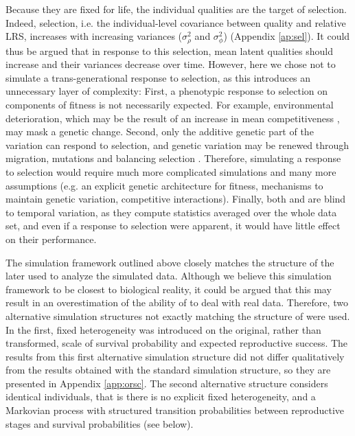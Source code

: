 Because they are fixed for life, the individual qualities are the target of selection. Indeed, selection, i.e. the individual-level covariance between quality and relative LRS, increases with increasing variances ($\sigma_{\rho}^2$ and $\sigma_{\phi}^2$) (Appendix \ref{ap:sel}). It could thus be argued that in response to this selection, mean latent qualities should increase and their variances decrease over time. However, here we chose not to simulate a trans-generational response to selection, as this introduces an unnecessary layer of complexity: First, a phenotypic response to selection on components of fitness is not necessarily expected. For example, environmental deterioration, which may be the result of an increase in mean competitiveness \parencite{Fisher1958,Hadfield2011}, may mask a genetic change. Second, only the additive genetic part of the variation can respond to selection, and genetic variation may be renewed through migration, mutations and balancing selection \parencite{Fisher1958,Charlesworth2014}.
Therefore, simulating a response to selection would require much more complicated simulations and many more assumptions (e.g. an explicit genetic architecture for fitness, mechanisms to maintain genetic variation, competitive interactions). 
Finally, both \MM and \NSM are blind to temporal variation, as they compute statistics averaged over the whole data set, and even if a response to selection were apparent, it would have little effect on their performance.

The simulation framework outlined above closely matches the structure of the \MM later used to analyze the simulated data. Although we believe this simulation framework to be closest to biological reality, it could be argued that this may result in an overestimation of the ability of \MM to deal with real data. Therefore, two alternative simulation structures not exactly matching the structure of \MM were used. In the first, fixed heterogeneity was introduced on the original, rather than transformed, scale of survival probability and expected reproductive success. The results from this first alternative simulation structure did not differ qualitatively from the results obtained with the standard simulation structure, so they are presented in Appendix \ref{app:orsc}. The second alternative structure considers identical individuals, that is there is no explicit fixed heterogeneity, and a Markovian process with structured transition probabilities between reproductive stages and survival probabilities (see below).

